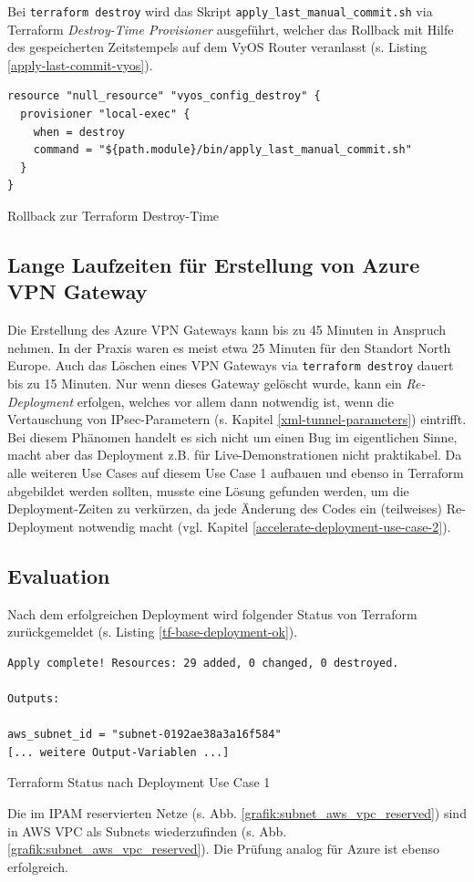Bei \texttt{terraform destroy} wird das Skript \texttt{apply\_last\_manual\_commit.sh} via Terraform \textit{Destroy-Time Provisioner} ausgeführt, welcher das \gls{Rollback} mit Hilfe des gespeicherten Zeitstempels auf dem VyOS Router veranlasst (s. Listing \ref{apply-last-commit-vyos}).
\begin{listing}[h]
\begin{verbatim}
resource "null_resource" "vyos_config_destroy" {
  provisioner "local-exec" {
    when = destroy
    command = "${path.module}/bin/apply_last_manual_commit.sh"
  }
}

\end{verbatim}
\caption{Rollback zur Terraform \glqq Destroy-Time\grqq{}}
\label{apply-last-commit-vyos}
\end{listing}\FloatBarrier
\subsection{Lange Laufzeiten für Erstellung von Azure VPN Gateway}\label{azure-deployment-time}
Die Erstellung des Azure \gls{VPN} Gateways kann bis zu 45 Minuten in Anspruch nehmen\cite{azurevpndeployment2021}. In der Praxis waren es meist etwa 25 Minuten für den Standort \glqq North Europe\grqq{}. Auch das Löschen eines \gls{VPN} Gateways via \texttt{terraform destroy} dauert bis zu 15 Minuten. Nur wenn dieses Gateway gelöscht wurde, kann ein \textit{Re-\gls{Deployment}} erfolgen, welches vor allem dann notwendig ist, wenn die Vertauschung von \gls{IPsec}-Parametern (s. Kapitel \ref{xml-tunnel-parameters}) eintrifft.\\
Bei diesem Phänomen handelt es sich nicht um einen Bug im eigentlichen Sinne, macht aber das \gls{Deployment} z.B. für Live-Demonstrationen nicht praktikabel. Da alle weiteren Use Cases auf diesem Use Case 1 aufbauen und ebenso in Terraform abgebildet werden sollten, musste eine Lösung gefunden werden, um die \gls{Deployment}-Zeiten zu verkürzen, da jede Änderung des Codes ein (teilweises) Re-\gls{Deployment} notwendig macht (vgl. Kapitel \ref{accelerate-deployment-use-case-2}).
\subsection{Evaluation}
Nach dem erfolgreichen \gls{Deployment} wird folgender Status von Terraform zurückgemeldet (s. Listing \ref{tf-base-deployment-ok}).
\begin{listing}[h]
\begin{verbatim}
Apply complete! Resources: 29 added, 0 changed, 0 destroyed.

Outputs:

aws_subnet_id = "subnet-0192ae38a3a16f584"
[... weitere Output-Variablen ...]
\end{verbatim}
\caption{Terraform Status nach Deployment Use Case 1}
\label{tf-base-deployment-ok}
\end{listing}\FloatBarrier
Die im \gls{IPAM} reservierten Netze (s. Abb. \ref{grafik:subnet_aws_vpc_reserved}) sind in AWS \gls{VPC} als Subnets wiederzufinden (s. Abb. \ref{grafik:subnet_aws_vpc_reserved}). Die Prüfung analog für Azure ist ebenso erfolgreich.

